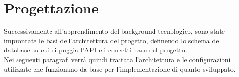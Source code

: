\chapter{Progettazione}
\label{cap:progettazione}

Successivamente all'apprendimento del background tecnologico, sono state improntate le basi dell'architettura del progetto, definendo lo schema del database su cui si poggia l'API e i concetti base del progetto.\\
Nei seguenti paragrafi verrà quindi trattata l'architettura e le configurazioni utilizzate che funzionano da base per l'implementazione di quanto sviluppato.\\


















